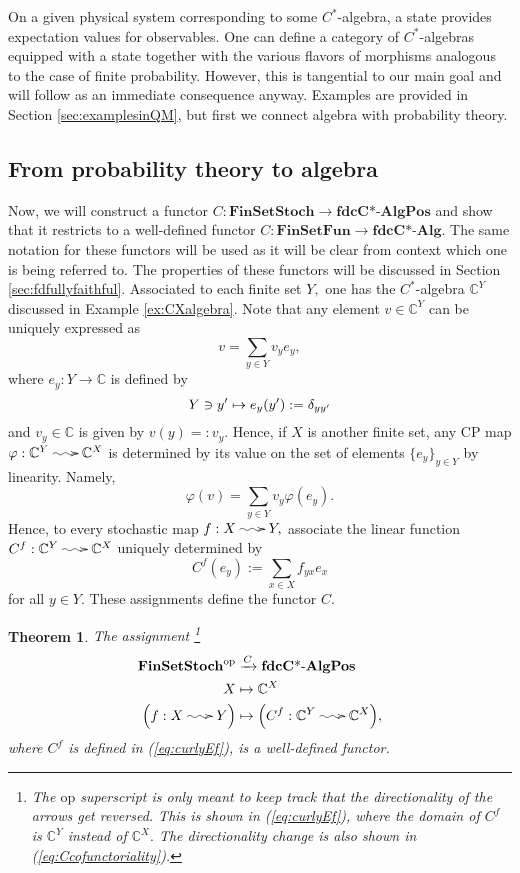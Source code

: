 \documentclass[12pt]{article}
\makeatletter
\theoremstyle{theorem}
\newtheorem{theorem}[equation]{Theorem}
\theoremstyle{definition}
\numberwithin{equation}{section}
\let\C=\Chi \let\W=\Omega
\def\vf{\varphi}
\newcommand{\be}{\begin{equation}}
\newcommand{\ee}{\end{equation}}
\newcommand{\bt}{\begin{theorem}}
\newcommand{\et}{\end{theorem}}
\newcommand{\<}{\langle}
\renewcommand{\>}{\rangle}
\def\C{{{\mathbb C}}}
\newcommand{\fdcCAlg}{\mathbf{fdcC\text{*-}Alg}}
\newcommand{\fdcCAlgPos}{\mathbf{fdcC\text{*-}AlgPos}}
\newcommand{\FinSetFun}{\mathbf{FinSetFun}}
\newcommand{\FinSetStoch}{\mathbf{FinSetStoch}}
\newcommand{\op}{\mathrm{op}}
\newcommand{\stoch}{\;\xy0;/r.25pc/:\ar@{~>}(3,0);(-3,0);\endxy\;}
\makeatother
\begin{document}
On a given physical system corresponding to some $C^*$-algebra, 
a state provides expectation values for observables. 
One can define a category of $C^*$-algebras equipped with a state
together with the various flavors of morphisms analogous to the case
of finite probability. However, this is tangential to our main goal
and will follow as an immediate consequence anyway. 
Examples are provided in Section \ref{sec:examplesinQM}, but first
we connect algebra with probability theory. 


\subsection{From probability theory to algebra}
\label{sec:fromfiniteprobtoalg}

Now, we will construct a functor 
$C:\FinSetStoch\to\fdcCAlgPos$ and show that it restricts to a well-defined 
functor $C:\FinSetFun\to\fdcCAlg.$ The same notation for these functors will
be used as it will be clear from context which one is being referred to. 
The properties of these functors will be discussed 
in Section \ref{sec:fdfullyfaithful}. 
Associated to each finite set $Y,$ one has the $C^*$-algebra
${\C}^{Y}$ discussed in Example \ref{ex:CXalgebra}. 
Note that any element $v\in\C^{Y}$ can be uniquely expressed as 
\be
v=\sum_{y\in Y}v_{y}e_{y},
\ee
where $e_{y}:Y\to\C$ is defined by 
\be
Y\ni y'\mapsto e_{y}(y'):=\de_{yy'}
\ee
and $v_{y}\in\C$ is given by $v(y)=:v_{y}.$ 
Hence, if $X$ is another finite set, 
any CP map $\vf:\C^{Y}\stoch\C^{X}$
is determined by its value on the set of elements $\{e_{y}\}_{y\in Y}$ by linearity. 
Namely, 
\be
\vf(v)=\sum_{y\in Y}v_{y}\vf(e_{y}).
\ee
Hence, to every stochastic map $f:X\stoch Y,$ associate the linear function
$C^{f}:\C^{Y}\stoch\C^{X}$ 
uniquely determined by 
\be
\label{eq:curlyEf}
C^{f}(e_{y}):=\sum_{x\in X}f_{yx}e_{x}
\ee
for all $y\in Y.$ 
These assignments define the functor $C.$ 

\bt
\label{thm:FinProbtoCP}
The assignment%
\footnote{The $\op$ superscript is only meant to keep track that the
directionality of the arrows get reversed. This is shown in 
(\ref{eq:curlyEf}), where the domain of $C^{f}$ is $\C^{Y}$ instead of
$\C^{X}.$ The directionality change is also shown in (\ref{eq:Ccofunctoriality}). 
}
\be
\begin{split}
\FinSetStoch^{\op}&\xrightarrow{C}\fdcCAlgPos\\
X&\mapsto\C^{X}\\
\Big(f:X\stoch Y\Big)&\mapsto\Big(C^{f}:\C^{Y}\stoch\C^{X}\Big),
\end{split}
\ee
where $C^{f}$ is defined in (\ref{eq:curlyEf}), 
is a well-defined functor. 
\et
\end{document}
